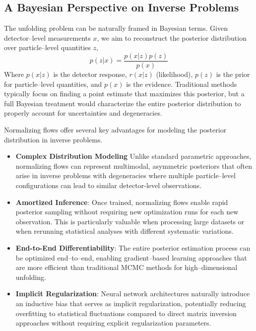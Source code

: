 \subsection{A Bayesian Perspective on Inverse Problems}
    The unfolding problem can be naturally framed in Bayesian terms.
    Given detector--level measurements \(x\), we aim to reconstruct the posterior distribution over particle--level quantities \(z\),
    \[
    p(z|x) = \frac{p(x|z)p(z)}{p(x)}
    \]
    Where $p(x|z)$ is the detector response, \(r(x|z)\) (likelihood), $p(z)$ is the prior for particle--level quantities, and $p(x)$ is the evidence.
    Traditional methods typically focus on finding a point estimate that maximizes this posterior, but a full Bayesian treatment would characterize the entire posterior distribution to properly account for uncertainties and degeneracies.

    Normalizing flows offer several key advantages for modeling the posterior distribution in inverse problems.
    \begin{itemize}
        \item \textbf{Complex Distribution Modeling} Unlike standard parametric approaches, normalizing flows can represent multimodal, asymmetric posteriors that often arise in inverse problems with degeneracies where multiple particle--level configurations can lead to similar detector-level observations.
        \item \textbf{Amortized Inference}: Once trained, normalizing flows enable rapid posterior sampling without requiring new optimization runs for each new observation.
            This is particularly valuable when processing large datasets or when rerunning statistical analyses with different systematic variations.
        \item \textbf{End-to-End Differentiability}: The entire posterior estimation process can be optimized end--to--end, enabling gradient--based learning approaches that are more efficient than traditional MCMC methods for high--dimensional unfolding.
        \item \textbf{Implicit Regularization}: Neural network architectures naturally introduce an inductive bias that serves as implicit regularization, potentially reducing overfitting to statistical fluctuations compared to direct matrix inversion approaches without requiring explicit regularization parameters.
    \end{itemize}
